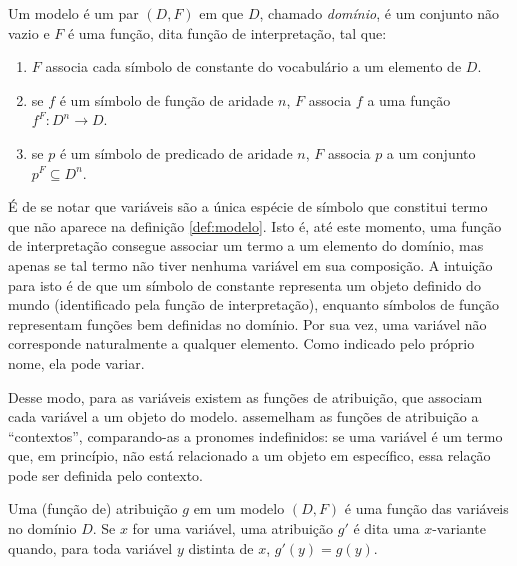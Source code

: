 \begin{defn}[Modelo] \label{def:modelo}
Um modelo é um par $(D,F)$ em que $D$, chamado \textit{domínio}, é um conjunto não vazio e $F$ é uma função, dita função de interpretação, tal que:
\begin{enumerate}
\item $F$ associa cada símbolo de constante do vocabulário a um elemento de $D$.
\item se $f$ é um símbolo de função de aridade $n$, $F$ associa $f$ a uma função $f^{F}: D^{n} \rightarrow D$.
\item se $p$ é um símbolo de predicado de aridade $n$, $F$ associa $p$ a um conjunto $p^{F} \subseteq D^{n}$.
\end{enumerate}
\end{defn}

É de se notar que variáveis são a única espécie de símbolo que constitui termo que não aparece na definição \ref{def:modelo}. Isto é, até este momento, uma função de interpretação consegue associar um termo a um elemento do domínio, mas apenas se tal termo não tiver nenhuma variável em sua composição. A intuição para isto é de que um símbolo de constante representa um objeto definido do mundo (identificado pela função de interpretação), enquanto símbolos de função representam funções bem definidas no domínio. Por sua vez, uma variável não corresponde naturalmente a qualquer elemento. Como indicado pelo próprio nome, ela pode variar. 

Desse modo, para as variáveis existem as funções de atribuição, que associam cada variável a um objeto do modelo. \citet[p.~12]{BlackburnBos:2005} assemelham as funções de atribuição a ``contextos'', comparando-as a pronomes indefinidos: se uma variável é um termo que, em princípio, não está relacionado a um objeto em específico, essa relação pode ser definida pelo contexto.


\begin{defn} \label{def:atribuicao}
Uma (função de) atribuição $g$ em um modelo $(D,F)$ é uma função das variáveis no domínio $D$. Se $x$ for uma variável, uma atribuição $g'$ é dita uma $x$-variante quando, para toda variável $y$ distinta de $x$, $g'(y) = g(y)$.
\end{defn}

